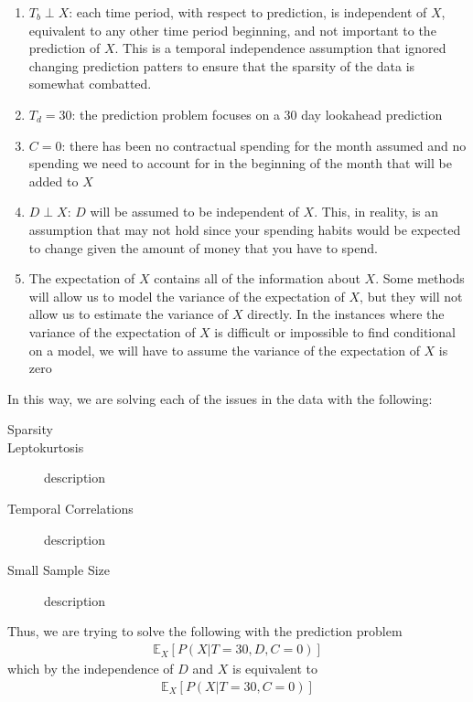 \documentclass[11pt,a4paper]{article}
\begin{document}
\begin{enumerate}
\item $T_b \perp X$: each time period, with respect to prediction, is independent of $X$, equivalent to any other time period beginning, and not important to the prediction of $X$. This is a temporal independence assumption that ignored changing prediction patters to ensure that the sparsity of the data is somewhat combatted. 
\item $T_d = 30$: the prediction problem focuses on a 30 day lookahead prediction
\item $C = 0$: there has been no contractual spending for the month assumed and no spending we need to account for in the beginning of the month that will be added to $X$
\item $D \perp X$: $D$ will be assumed to be independent of $X$. This, in reality, is an assumption that may not hold since your spending habits would be expected to change given the amount of money that you have to spend. 
\item The expectation of $X$ contains all of the information about $X$. Some methods will allow us to model the variance of the expectation of $X$, but they will not allow us to estimate the variance of $X$ directly. In the instances where the variance of the expectation of $X$ is difficult or impossible to find conditional on a model, we will have to assume the variance of the expectation of $X$ is zero
\end{enumerate}

In this way, we are solving each of the issues in the data with the following:
\begin{description}
	\item[Sparsity] 
	\item[Leptokurtosis] description
	\item[Temporal Correlations] description
	\item[Small Sample Size] description
\end{description}

Thus, we are trying to solve the following with the prediction problem
\begin{align*}
\mathbb{E}_X\left[ P(X | T = 30, D, C = 0) \right]
\end{align*}
which by the independence of $D$ and $X$ is equivalent to
\begin{align*}
\mathbb{E}_X\left[ P(X | T = 30, C = 0) \right]
\end{align*}
\end{document}
